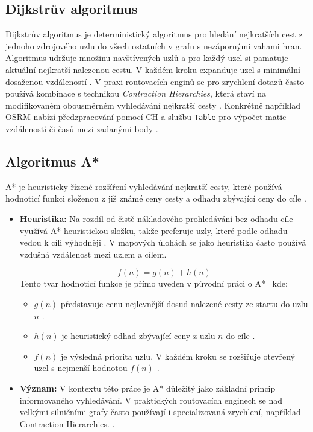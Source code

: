 \subsection{Dijkstrův algoritmus}
Dijkstrův algoritmus je deterministický algoritmus pro hledání nejkratších cest z jednoho zdrojového uzlu do všech ostatních v grafu s nezápornými vahami hran. Algoritmus udržuje množinu navštívených uzlů a pro každý uzel si pamatuje aktuální nejkratší nalezenou cestu. V každém kroku expanduje uzel s minimální dosaženou vzdáleností \cite{dijkstra1959note}. V praxi routovacích enginů se pro zrychlení dotazů často používá kombinace s technikou \textit{Contraction Hierarchies}, která staví na modifikovaném obousměrném vyhledávání nejkratší cesty \cite{geisberger2008ch}. Konkrétně například OSRM nabízí předzpracování pomocí CH a službu \texttt{Table} pro výpočet matic vzdáleností či časů mezi zadanými body \cite{osrm_backend_readme}.


\subsection{Algoritmus A*}
A* je heuristicky řízené rozšíření vyhledávání nejkratší cesty, které používá hodnoticí funkci složenou z již známé ceny cesty a odhadu zbývající ceny do cíle \cite{hart1968astar}.
\begin{itemize}
    \item \textbf{Heuristika:} Na rozdíl od čistě nákladového prohledávání bez odhadu cíle využívá A* heuristickou složku, takže preferuje uzly, které podle odhadu vedou k cíli výhodněji \cite{hart1968astar}. V mapových úlohách se jako heuristika často používá vzdušná vzdálenost mezi uzlem a cílem.

\begin{equation}
\label{eq:a_star}
f(n) = g(n) + h(n)
\end{equation}
Tento tvar hodnoticí funkce je přímo uveden v původní práci o A*~\cite{hart1968astar} kde:
\begin{itemize}
    \item $g(n)$ představuje cenu nejlevnější dosud nalezené cesty ze startu do uzlu $n$ \cite{hart1968astar}.
    \item $h(n)$ je heuristický odhad zbývající ceny z uzlu $n$ do cíle \cite{hart1968astar}.
\item $f(n)$ je výsledná priorita uzlu. V každém kroku se rozšiřuje otevřený uzel s nejmenší hodnotou $f(n)$ \cite{hart1968astar}.
\end{itemize}
    \item \textbf{Význam:} V kontextu této práce je A* důležitý jako základní princip informovaného vyhledávání. V praktických routovacích enginech se nad velkými silničními grafy často používají i specializovaná zrychlení, například Contraction Hierarchies. \cite{geisberger2008ch,osrm_backend_readme}.
\end{itemize}





